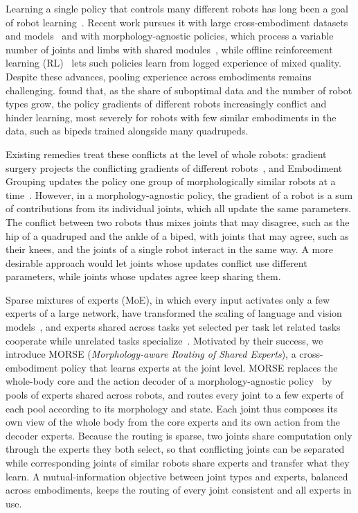 Learning a single policy that controls many different robots has long been a goal of robot
learning~\citep{huang2020smp,bohlinger2024onepolicy}. Recent work pursues it with large cross-embodiment datasets and
models~\citep{oxe2024,octo2024} and with morphology-agnostic policies, which process a variable number of joints and
limbs with shared modules~\citep{gupta2022metamorph,bohlinger2024onepolicy}, while offline reinforcement learning
(RL)~\citep{levine2020offline,kostrikov2022iql} lets such policies learn from logged experience of mixed quality.
Despite these advances, pooling experience across embodiments remains challenging. \citet{abe2026crossembodimentoffline}
found that, as the share of suboptimal data and the number of robot types grow, the policy gradients of different robots
increasingly conflict and hinder learning, most severely for robots with few similar embodiments in the data, such as
bipeds trained alongside many quadrupeds.

Existing remedies treat these conflicts at the level of whole robots: gradient surgery projects the conflicting
gradients of different robots~\citep{yu2020pcgrad}, and Embodiment Grouping updates the policy one group of
morphologically similar robots at a time~\citep{abe2026crossembodimentoffline}. However, in a morphology-agnostic
policy, the gradient of a robot is a sum of contributions from its individual joints, which all update the same
parameters. The conflict between two robots thus mixes joints that may disagree, such as the hip of a quadruped and the
ankle of a biped, with joints that may agree, such as their knees, and the joints of a single robot interact in the same
way. A more desirable approach would let joints whose updates conflict use different parameters, while joints whose
updates agree keep sharing them.

Sparse mixtures of experts (MoE), in which every input activates only a few experts of a large network, have
transformed the scaling of language and vision
models~\citep{shazeer2017outrageously,fedus2022switch,riquelme2021vmoe}, and experts shared across tasks yet selected
per task let related tasks cooperate while unrelated tasks specialize~\citep{ma2018mmoe,chen2023modsquad}. Motivated by
their success, we introduce MORSE (\emph{Morphology-aware Routing of Shared Experts}), a cross-embodiment policy that
learns experts at the joint level. MORSE replaces the whole-body core and the action decoder of a morphology-agnostic
policy~\citep{bohlinger2024onepolicy} by pools of experts shared across robots, and routes every joint to a few experts
of each pool according to its morphology and state. Each joint thus composes its own view of the whole body from the core
experts and its own action from the decoder experts. Because the routing is sparse, two joints share computation only
through the experts they both select, so that conflicting joints can be separated while corresponding joints of similar
robots share experts and transfer what they learn. A mutual-information objective between joint types and experts,
balanced across embodiments, keeps the routing of every joint consistent and all experts in use.

